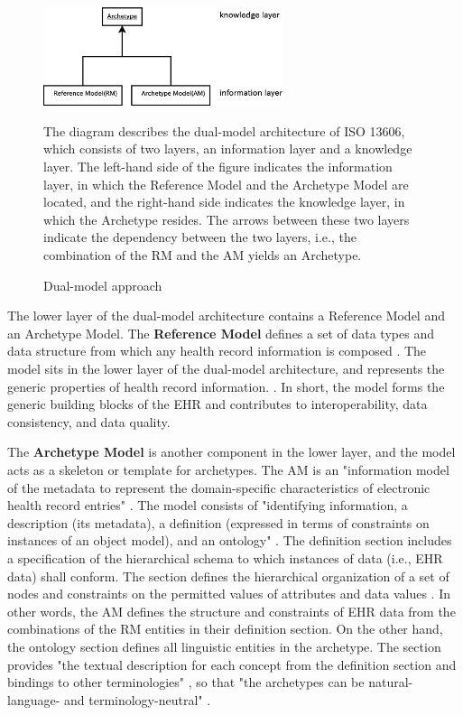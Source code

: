 \documentclass[preprint,3p,onecolumn,times,review]{elsarticle}
\begin{document}
\begin{figure}[!htbp]
  \begin{center}
    \includegraphics[width=7cm,clip]{dual_model_approach.eps}  
  \end{center}
  \caption{Dual-model approach}\label{fig:dual_model_approach}
  The diagram describes the dual-model architecture of ISO 13606, which consists of two layers, an information layer and a knowledge layer. The left-hand side of the figure indicates the information layer, in which the Reference Model and the Archetype Model are located, and the right-hand side indicates the knowledge layer, in which the Archetype resides.
  The arrows between these two layers indicate the dependency between the two layers, i.e., the combination of the RM and the AM yields an Archetype.
\end{figure}


The lower layer of the dual-model architecture contains a Reference Model and an Archetype Model.
The {\bf Reference Model} defines a set of data types and data structure from which any health record information is composed \cite[p.vi]{iso08:13606_healt_elect_part1}.
The model sits in the lower layer of the dual-model architecture, and represents the generic properties of health record information. \cite[p.vi]{iso08:13606_healt_elect_part1}.
In short, the model forms the generic building blocks of the EHR and contributes to interoperability, data consistency, and data quality.

The {\bf Archetype Model} is another component in the lower layer, and the model acts as a skeleton or template for archetypes.
The AM is an "information model of the metadata to represent the domain-specific characteristics of electronic health record entries"  \cite[p.2]{iso08:13606_healt_elect_part1}.
The model consists of "identifying information, a description (its metadata), a definition (expressed in terms of constraints on instances of an object model), and an ontology" \cite[p.vii]{iso08:13606_healt_elect_part2}.
The definition section includes a specification of the hierarchical schema to which instances of data (i.e., EHR data) shall conform.
The section defines the hierarchical organization of a set of nodes and constraints on the permitted values of attributes and data values \cite[p.6]{iso08:13606_healt_elect_part2}.
In other words, the AM defines the structure and constraints of EHR data from the combinations of the RM entities in their definition section.
On the other hand, the ontology section defines all linguistic entities in the archetype.
The section provides "the textual description for each concept from the definition section and bindings to other terminologies" \cite[p.871]{costa11:_clinic}, so that "the archetypes can be natural-language- and terminology-neutral" \cite[vii]{iso08:13606_healt_elect_part2}.
\end{document}
